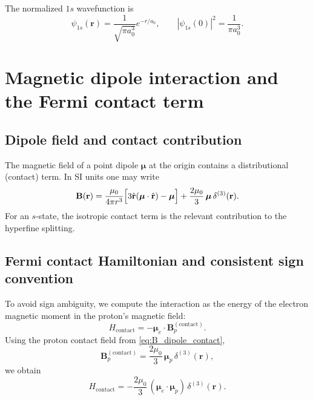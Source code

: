 \documentclass[11pt,a4paper]{article}
\begin{document}
        The normalized $1s$ wavefunction is
        \begin{equation}
            \psi_{1s}(\mathbf{r})=\frac{1}{\sqrt{\pi a_0^3}}e^{-r/a_0},
            \qquad
            |\psi_{1s}(0)|^2=\frac{1}{\pi a_0^3}.
            \label{eq:psi0}
        \end{equation}

    \section{Magnetic dipole interaction and the Fermi contact term}
        \label{sec:fermi}
        
        \subsection{Dipole field and contact contribution}
            The magnetic field of a point dipole $\boldsymbol{\mu}$ at the origin contains a distributional (contact) term.
            In SI units one may write \cite{Jackson1999}
            \begin{equation}
                \mathbf{B}(\mathbf{r})
                =
                \frac{\mu_0}{4\pi r^3}\Bigl[3\hat{\mathbf{r}}(\boldsymbol{\mu}\cdot\hat{\mathbf{r}})-\boldsymbol{\mu}\Bigr]
                +\frac{2\mu_0}{3}\,\boldsymbol{\mu}\,\delta^{(3)}(\mathbf{r}).
                \label{eq:B_dipole_contact}
            \end{equation}
            For an $s$-state, the isotropic contact term is the relevant contribution to the hyperfine splitting.
        
        \subsection{Fermi contact Hamiltonian and consistent sign convention}
            To avoid sign ambiguity, we compute the interaction as the energy of the electron magnetic moment
            in the proton's magnetic field:
            \begin{equation}
                H_{\mathrm{contact}}
                =
                -\boldsymbol{\mu}_e\cdot \mathbf{B}_p^{(\mathrm{contact})}.
            \end{equation}
            Using the proton contact field from \eqref{eq:B_dipole_contact},
            \begin{equation}
                \mathbf{B}_p^{(\mathrm{contact})}
                =
                \frac{2\mu_0}{3}\,\boldsymbol{\mu}_p\,\delta^{(3)}(\mathbf{r}),
            \end{equation}
            we obtain
            \begin{equation}
                H_{\mathrm{contact}}
                =
                -\frac{2\mu_0}{3}\,(\boldsymbol{\mu}_e\cdot \boldsymbol{\mu}_p)\,\delta^{(3)}(\mathbf{r}).
                \label{eq:H_contact_start}
            \end{equation}
            
\end{document}
